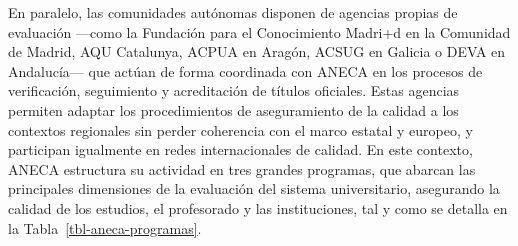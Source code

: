 \documentclass[
  11pt,
  a4paper,
  twoside]{scrreprt}
\begin{document}
En paralelo, las comunidades autónomas disponen de agencias propias de
evaluación ---como la Fundación para el Conocimiento Madri+d en la
Comunidad de Madrid, AQU Catalunya, ACPUA en Aragón, ACSUG en Galicia o
DEVA en Andalucía--- que actúan de forma coordinada con ANECA en los
procesos de verificación, seguimiento y acreditación de títulos
oficiales. Estas agencias permiten adaptar los procedimientos de
aseguramiento de la calidad a los contextos regionales sin perder
coherencia con el marco estatal y europeo, y participan igualmente en
redes internacionales de calidad. En este contexto, ANECA estructura su
actividad en tres grandes programas, que abarcan las principales
dimensiones de la evaluación del sistema universitario, asegurando la
calidad de los estudios, el profesorado y las instituciones, tal y como
se detalla en la Tabla~\ref{tbl-aneca-programas}.
\end{document}
